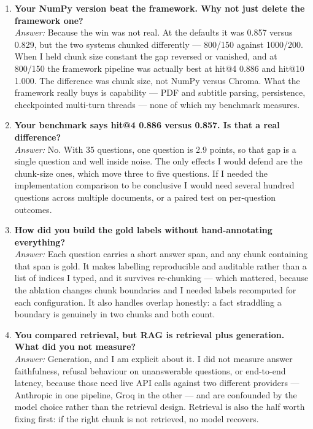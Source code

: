 \documentclass[11pt,a4paper]{article}
\begin{document}
\begin{enumerate}[leftmargin=*,itemsep=6pt]

\item \textbf{Your NumPy version beat the framework. Why not just delete the
framework one?}\\
\emph{Answer:} Because the win was not real. At the defaults it was 0.857 versus
0.829, but the two systems chunked differently --- 800/150 against 1000/200. When I
held chunk size constant the gap reversed or vanished, and at 800/150 the
framework pipeline was actually best at hit@4 0.886 and hit@10 1.000. The
difference was chunk size, not NumPy versus Chroma. What the framework really
buys is capability --- PDF and subtitle parsing, persistence, checkpointed
multi-turn threads --- none of which my benchmark measures.

\item \textbf{Your benchmark says hit@4 0.886 versus 0.857. Is that a real
difference?}\\
\emph{Answer:} No. With 35 questions, one question is 2.9 points, so that gap is a
single question and well inside noise. The only effects I would defend are the
chunk-size ones, which move three to five questions. If I needed the
implementation comparison to be conclusive I would need several hundred questions
across multiple documents, or a paired test on per-question outcomes.

\item \textbf{How did you build the gold labels without hand-annotating
everything?}\\
\emph{Answer:} Each question carries a short answer span, and any chunk containing
that span is gold. It makes labelling reproducible and auditable rather than a
list of indices I typed, and it survives re-chunking --- which mattered, because
the ablation changes chunk boundaries and I needed labels recomputed for each
configuration. It also handles overlap honestly: a fact straddling a boundary is
genuinely in two chunks and both count.

\item \textbf{You compared retrieval, but RAG is retrieval plus generation. What
did you not measure?}\\
\emph{Answer:} Generation, and I am explicit about it. I did not measure answer
faithfulness, refusal behaviour on unanswerable questions, or end-to-end latency,
because those need live API calls against two different providers --- Anthropic in
one pipeline, Groq in the other --- and are confounded by the model choice rather
than the retrieval design. Retrieval is also the half worth fixing first: if the
right chunk is not retrieved, no model recovers.


\end{enumerate}
\end{document}
